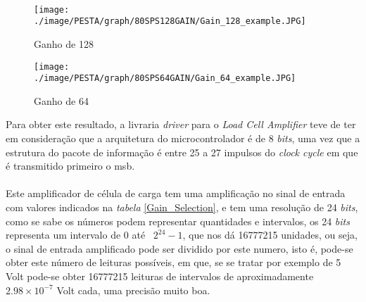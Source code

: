 \\
\begin{minipage}[!b]{\linewidth}
\begin{minipage}[!b]{.43\linewidth}
\begin{figure}[H]
	\captionsetup{justification=raggedright,singlelinecheck=false}
	\flushleft
	\texttt{[image: ./image/PESTA/graph/80SPS128GAIN/Gain\_128\_example.JPG]}
	\caption{Ganho de 128}
	\label{Gain_128_example}
\end{figure}
\end{minipage}
\hspace{.8cm}
\begin{minipage}[!b]{.43\linewidth}
\begin{figure}[H]
	\captionsetup{justification=raggedright,singlelinecheck=false}
	\flushleft
	\texttt{[image: ./image/PESTA/graph/80SPS64GAIN/Gain\_64\_example.JPG]}
	\caption{Ganho de 64}
	\label{Gain_64_example}
\end{figure}
\end{minipage}
\end{minipage}
Para obter este resultado, a livraria \textit{driver} para o \textit{Load Cell Amplifier} teve de ter em consideração que a arquitetura do microcontrolador é de 8 \textit{bits}, uma vez que a estrutura do pacote de informação é entre 25 a 27 impulsos do \textit{clock cycle} em que é transmitido primeiro o \ac{msb}.
\\
\\
Este amplificador de célula de carga tem uma amplificação no sinal de entrada com valores indicados na \textit{tabela} \ref{Gain_Selection}, e tem uma resolução de 24 \textit{bits}, como se sabe os números podem representar quantidades e intervalos, os 24 \textit{bits} representa um intervalo de 0 até \, $2^{24}-1$, que nos dá 16777215 unidades, ou seja, o sinal de entrada amplificado pode ser dividido por este numero, isto é, pode-se obter este número de leituras possíveis, em que, se se tratar por exemplo de 5 Volt pode-se obter 16777215 leituras de intervalos de aproximadamente $2.98 \times 10^{-7}$ Volt cada, uma precisão muito boa.
